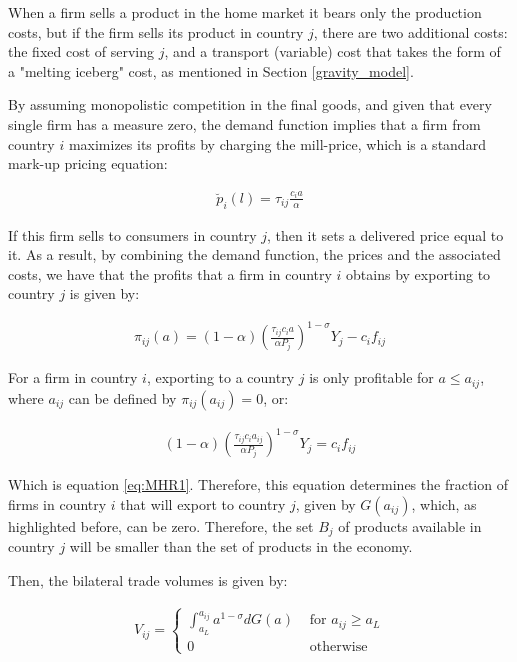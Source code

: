 When a firm sells a product in the home market it bears only the production costs, but if the firm sells its product in country $j$, there are two additional costs: the fixed cost of serving $j$, and a transport (variable) cost that takes the form of a "melting iceberg" cost, as mentioned in Section \ref{gravity_model}. 

By assuming monopolistic competition in the final goods, and given that every single firm has a measure zero, the demand function implies that a firm from country $i$ maximizes its profits by charging the mill-price, which is a standard mark-up pricing equation:

\begin{align}
    \breve{p}_{i}(l)=\tau_{i j} \frac{c_{i} a}{\alpha}
\end{align}

If this firm sells to consumers in country $j$, then it sets a delivered price equal to it.
As a result, by combining the demand function, the prices and the associated costs, we have that the profits that a firm in country $i$ obtains by exporting to country $j$ is given by:

\begin{align}
    \pi_{i j}(a)=(1-\alpha)\left(\frac{\tau_{i j} c_{i} a}{\alpha P_{j}}\right)^{1-\sigma} Y_{j}-c_{i} f_{i j}
\end{align}

For a firm in country $i$, exporting to a country $j$ is only profitable for $a \leq a_{ij}$, where $a_{ij}$ can be defined by $\pi_{ij} (a_{ij}) = 0$, or:

\begin{align} \label{final_1}
    (1-\alpha)\left(\frac{\tau_{i j} c_{i} a_{i j}}{\alpha P_{j}}\right)^{1-\sigma} Y_{j}=c_{i} f_{i j}
\end{align}

Which is equation \ref{eq:MHR1}. Therefore, this equation determines the fraction of firms in country $i$ that will export to country $j$, given by $G(a_{ij})$, which, as highlighted before, can be zero. Therefore, the set $B_j$ of products available in country $j$ will be smaller than the set of products in the economy.

Then, the bilateral trade volumes is given by:

\begin{align} \label{final_2}
V_{i j}=\left\{\begin{array}{cc}
\int_{a_{L}}^{a_{i j}} a^{1-\sigma} d G(a) & \text { for } a_{i j} \geq a_{L} \\
0 & \text { otherwise }
\end{array}\right.
\end{align}


